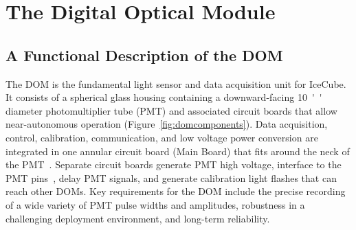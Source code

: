 
\newcommand{\degC}[1]{$\unit[#1]{^\circ{C}}$}
\def\lsim{\mathrel{\rlap{\raise 0.2ex\hbox{$\,<\,$}}{\lower 0.9ex\hbox{$\,\sim\,$}}}}
\def\gsim{\mathrel{\rlap{\raise 0.2ex\hbox{$\,>\,$}}{\lower 0.9ex\hbox{$\,\sim\,$}}}}


\section{\label{sec:dom}The Digital Optical Module}

\subsection{\label{sec:dom_functional} A Functional Description of the DOM}

The DOM is the fundamental light sensor and data acquisition unit for IceCube.
It consists of a spherical glass housing 
containing a downward-facing \SI{10}{''} diameter photomultiplier tube (PMT)
and associated circuit boards that allow near-autonomous operation (Figure~\ref{fig:domcomponents}).
Data acquisition, control, calibration, communication, and low voltage power conversion 
are integrated in one annular circuit board (Main Board) that fits around the neck of the PMT~\cite{ref:domdaq}. 
Separate circuit boards generate PMT high voltage, interface to the PMT pins~\cite{ref:pmt},
delay PMT signals, and generate calibration light flashes that can reach other DOMs.
Key requirements for the DOM include
the precise recording of a wide variety of PMT pulse widths and amplitudes, robustness in
a challenging deployment environment, and long-term reliability.

